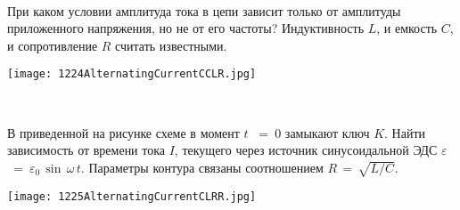 \begin{ex}
\hspace{0pt} \\
\begin{minipage}{.65\textwidth}
При каком условии амплитуда тока в цепи зависит только от амплитуды приложенного напряжения, 
но не от его частоты? Индуктивность $L$, и емкость $C$, и сопротивление $R$ считать известными.
\end{minipage}
\begin{minipage}{.35\textwidth}
\centering
\texttt{[image: 1224AlternatingCurrentCCLR.jpg]}
\end{minipage}
\begin{ans}
\end{ans}
\end{ex}

\begin{ex}
\hspace{0pt} \\
\begin{minipage}{.65\textwidth}
В приведенной на рисунке схеме в момент $t$~ =~0 замыкают ключ $K$. Найти зависимость от времени тока $I$, текущего через источник синусоидальной ЭДС {\Large $\varepsilon$}~=~{\Large $\varepsilon_0$}\,$\sin\,\omega\,t$.
Параметры контура связаны соотношением $R\,=\,\sqrt{L/C}$.
\end{minipage}
\begin{minipage}{.35\textwidth}
\centering
\texttt{[image: 1225AlternatingCurrentCLRR.jpg]}
\end{minipage}
\begin{ans}
\end{ans}
\end{ex}